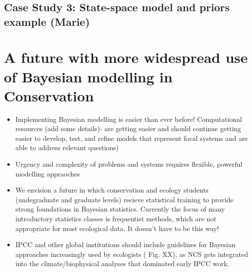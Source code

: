 \documentclass{article}
\begin{document}
\subsection*{Case Study 3: State-space model and priors example (Marie)}


\section* {A future with more widespread use of Bayesian modelling in Conservation}
\begin{itemize}
\item Implementing Bayesian modelling is easier than ever before! Computational resources (add some details)- are getting easier and should continue getting easier to develop, test, and refine models that represent focal systems and are able to address relevant questions)
\item Urgency and complexity of problems and systems requires flexible, powerful modelling appraoches 
\item We envision a future in which conservation and ecology students (undegraduate and graduate levels) recieve statistical training to provide strong foundations in Bayesian statistics. Currently the focus of many introductory statistics classes is frequentist methods, which are not appropriate for most ecological data. It doesn't have to be this way! 
\item IPCC and other global institutions should include guidelines for Bayesian approaches increasingly used by ecologists ( Fig. XX), as NCS gets integrated into the climate/biophysical analyses that dominated early IPCC work.
\end{itemize}

\par 
\end{document}
